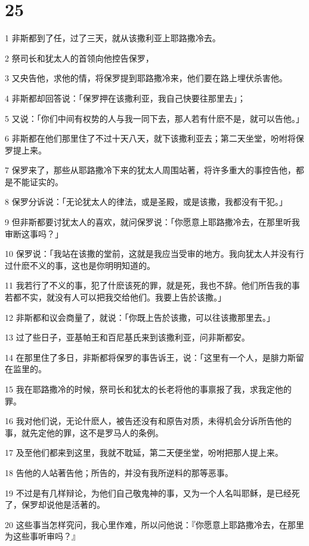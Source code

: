\chapter{25}

\par 1 非斯都到了任，过了三天，就从该撒利亚上耶路撒冷去。
\par 2 祭司长和犹太人的首领向他控告保罗，
\par 3 又央告他，求他的情，将保罗提到耶路撒冷来，他们要在路上埋伏杀害他。
\par 4 非斯都却回答说：「保罗押在该撒利亚，我自己快要往那里去」；
\par 5 又说：「你们中间有权势的人与我一同下去，那人若有什麽不是，就可以告他。」
\par 6 非斯都在他们那里住了不过十天八天，就下该撒利亚去；第二天坐堂，吩咐将保罗提上来。
\par 7 保罗来了，那些从耶路撒冷下来的犹太人周围站著，将许多重大的事控告他，都是不能证实的。
\par 8 保罗分诉说：「无论犹太人的律法，或是圣殿，或是该撒，我都没有干犯。」
\par 9 但非斯都要讨犹太人的喜欢，就问保罗说：「你愿意上耶路撒冷去，在那里听我审断这事吗？」
\par 10 保罗说：「我站在该撒的堂前，这就是我应当受审的地方。我向犹太人并没有行过什麽不义的事，这也是你明明知道的。
\par 11 我若行了不义的事，犯了什麽该死的罪，就是死，我也不辞。他们所告我的事若都不实，就没有人可以把我交给他们。我要上告於该撒。」
\par 12 非斯都和议会商量了，就说：「你既上告於该撒，可以往该撒那里去。」
\par 13 过了些日子，亚基帕王和百尼基氏来到该撒利亚，问非斯都安。
\par 14 在那里住了多日，非斯都将保罗的事告诉王，说：「这里有一个人，是腓力斯留在监里的。
\par 15 我在耶路撒冷的时候，祭司长和犹太的长老将他的事禀报了我，求我定他的罪。
\par 16 我对他们说，无论什麽人，被告还没有和原告对质，未得机会分诉所告他的事，就先定他的罪，这不是罗马人的条例。
\par 17 及至他们都来到这里，我就不耽延，第二天便坐堂，吩咐把那人提上来。
\par 18 告他的人站著告他；所告的，并没有我所逆料的那等恶事。
\par 19 不过是有几样辩论，为他们自己敬鬼神的事，又为一个人名叫耶稣，是已经死了，保罗却说他是活著的。
\par 20 这些事当怎样究问，我心里作难，所以问他说：『你愿意上耶路撒冷去，在那里为这些事听审吗？』

